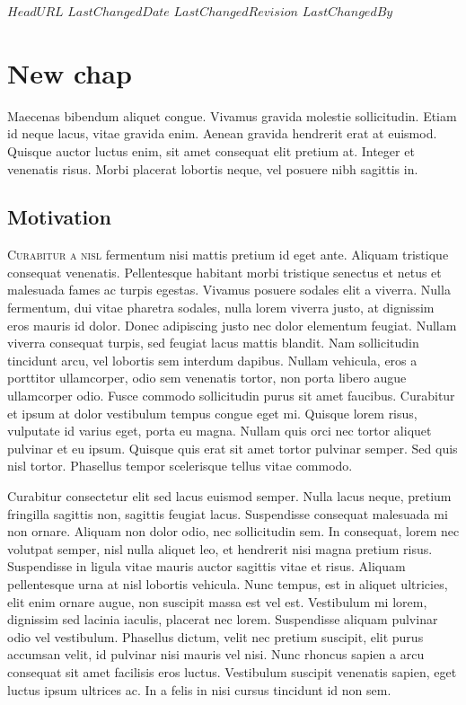 \svnidlong
{$HeadURL$}
{$LastChangedDate$}
{$LastChangedRevision$}
{$LastChangedBy$}

\chapter{New chap}

\begin{introduction}
  Maecenas bibendum aliquet congue. Vivamus gravida molestie sollicitudin. Etiam
  id neque lacus, vitae gravida enim. Aenean gravida hendrerit erat at
  euismod. Quisque auctor luctus enim, sit amet consequat elit pretium
  at. Integer et venenatis risus. Morbi placerat lobortis neque, vel posuere
  nibh sagittis in.
\end{introduction}



\section{Motivation}

\lettrine{C}{urabitur a nisl} fermentum nisi mattis pretium id eget ante.
Aliquam tristique consequat venenatis. Pellentesque habitant morbi tristique
senectus et netus et malesuada fames ac turpis egestas. Vivamus posuere sodales
elit a viverra. Nulla fermentum, dui vitae pharetra sodales, nulla lorem viverra
justo, at dignissim eros mauris id dolor. Donec adipiscing justo nec dolor
elementum feugiat. Nullam viverra consequat turpis, sed feugiat lacus mattis
blandit. Nam sollicitudin tincidunt arcu, vel lobortis sem interdum
dapibus. Nullam vehicula, eros a porttitor ullamcorper, odio sem venenatis
tortor, non porta libero augue ullamcorper odio. Fusce commodo sollicitudin
purus sit amet faucibus. Curabitur et ipsum at dolor vestibulum tempus congue
eget mi. Quisque lorem risus, vulputate id varius eget, porta eu magna. Nullam
quis orci nec tortor aliquet pulvinar et eu ipsum. Quisque quis erat sit amet
tortor pulvinar semper. Sed quis nisl tortor. Phasellus tempor scelerisque
tellus vitae commodo.

Curabitur consectetur elit sed lacus euismod semper. Nulla lacus neque, pretium
fringilla sagittis non, sagittis feugiat lacus. Suspendisse consequat malesuada
mi non ornare. Aliquam non dolor odio, nec sollicitudin sem. In consequat, lorem
nec volutpat semper, nisl nulla aliquet leo, et hendrerit nisi magna pretium
risus. Suspendisse in ligula vitae mauris auctor sagittis vitae et
risus. Aliquam pellentesque urna at nisl lobortis vehicula. Nunc tempus, est in
aliquet ultricies, elit enim ornare augue, non suscipit massa est vel
est. Vestibulum mi lorem, dignissim sed lacinia iaculis, placerat nec
lorem. Suspendisse aliquam pulvinar odio vel vestibulum. Phasellus dictum, velit
nec pretium suscipit, elit purus accumsan velit, id pulvinar nisi mauris vel
nisi. Nunc rhoncus sapien a arcu consequat sit amet facilisis eros
luctus. Vestibulum suscipit venenatis sapien, eget luctus ipsum ultrices ac. In
a felis in nisi cursus tincidunt id non sem.

